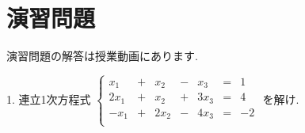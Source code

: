 \documentclass[dvipdfmx,a4paper,11pt]{article}
\newcommand{\maru}[1]{\raise0.2ex\hbox{\textcircled{\tiny{#1}}}}
\theoremstyle{definition}
\begin{document}
\begin{comment}
 \end{pmatrix}
  \overset{\text{\maru{2}と\maru{3}を入れ替え}}{\longrightarrow} 
\begin{pmatrix}
1& 1  & -1&-2\\
 0& 1  & 1&1\\
 0 & 3& 1&-1\\
 \end{pmatrix}
 \\
 &  \overset{\text{
$ \maru{1}  + \maru{2}\times(-1)$ と$\maru{3} +  \maru{2}\times(-3) $
 }}{\longrightarrow} 
 \begin{pmatrix}
1& 0  & -2&-3\\
 0& 1  & 1&1\\
 0 & 0& -2&-4\\
 \end{pmatrix}
   \overset{\text{\maru{3}$\times (-\frac{1}{2})$}}{\longrightarrow}
\begin{pmatrix}
1& 0  & -2&-3\\
 0& 1  & 1&1\\
 0 & 0& 1&2\\
 \end{pmatrix} 
 \\
 &\overset{\text{
$\maru{1} + \maru{3}\times 2 $ と $\maru{2} + \maru{3}\times(-1) $
  }}{\longrightarrow} 
  \begin{pmatrix}
1& 0  & 0&-1\\
 0& 1  & 0&-1\\
 0 & 0& 1&2\\
 \end{pmatrix} 
\end{align*}

\begin{align*}
 \begin{pmatrix}
 2& 3  & -1&-3\\
-1 & 2 & 2&1\\
1& 1  & -1&-2\\
 \end{pmatrix}
&\overset{\text{対応}}{\leftrightarrow} 
 \left\{ 
\begin{matrix}
2x&+&3y& -&z &= &-3 \\
-x&+&2y& +&2z &= &1 \\
x&+&y& -&z &= &-2 \\
\end{matrix}
\right.
\\
\end{align*}


  \end{comment}

 
 
\section{演習問題}
演習問題の解答は授業動画にあります.

1. 連立1次方程式
 $
 \left\{ 
\begin{matrix}
x_1&+&x_2& -&x_3 &= & 1\\
2x_1&+&x_2& +&3x_3&= &4 \\
-x_1&+&2x_2& -&4x_3 &= &-2 \\
\end{matrix}
\right.
 $
 を解け.


 
\end{document}
